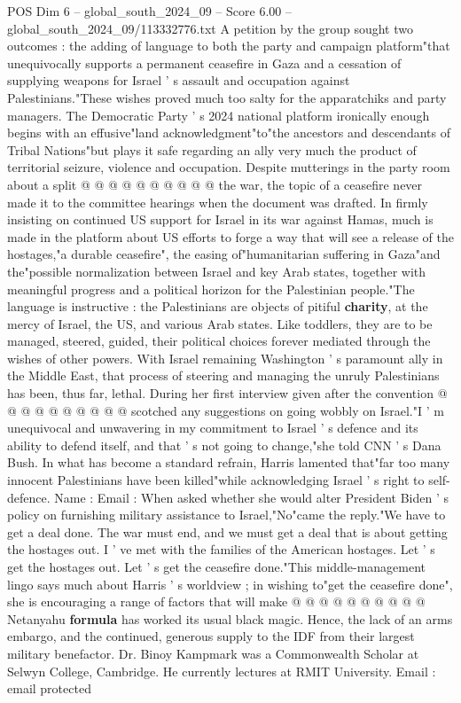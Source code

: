 \begin{textsample}{POS Dim 6 – global\_south\_2024\_09 – Score 6.00 – global\_south\_2024\_09/113332776.txt}
A petition by the group sought two outcomes : the adding of language to both the party and campaign platform"that unequivocally supports a permanent ceasefire in Gaza and a cessation of supplying weapons for Israel ' s assault and occupation against Palestinians."These wishes proved much too salty for the apparatchiks and party managers.
The Democratic Party ' s 2024 national platform ironically enough begins with an effusive"land acknowledgment"to"the ancestors and descendants of Tribal Nations"but plays it safe regarding an ally very much the product of territorial seizure, violence and occupation.
Despite mutterings in the party room about a split @ @ @ @ @ @ @ @ @ @ the war, the topic of a ceasefire never made it to the committee hearings when the document was drafted.
In firmly insisting on continued US support for Israel in its war against Hamas, much is made in the platform about US efforts to forge a way that will see a release of the hostages,"a durable ceasefire", the easing of"humanitarian suffering in Gaza"and the"possible normalization between Israel and key Arab states, together with meaningful progress and a political horizon for the Palestinian people."The language is instructive : the Palestinians are objects of pitiful \textbf{charity}, at the mercy of Israel, the US, and various Arab states.
Like toddlers, they are to be managed, steered, guided, their political choices forever mediated through the wishes of other powers.
With Israel remaining Washington ' s paramount ally in the Middle East, that process of steering and managing the unruly Palestinians has been, thus far, lethal.
During her first interview given after the convention @ @ @ @ @ @ @ @ @ @ scotched any suggestions on going wobbly on Israel."I ' m unequivocal and unwavering in my commitment to Israel ' s defence and its ability to defend itself, and that ' s not going to change,"she told CNN ' s Dana Bush.
In what has become a standard refrain, Harris lamented that"far too many innocent Palestinians have been killed"while acknowledging Israel ' s right to self-defence.
Name : Email : When asked whether she would alter President Biden ' s policy on furnishing military assistance to Israel,"No"came the reply."We have to get a deal done.
The war must end, and we must get a deal that is about getting the hostages out.
I ' ve met with the families of the American hostages.
Let ' s get the hostages out.
Let ' s get the ceasefire done."This middle-management lingo says much about Harris ' s worldview ; in wishing to"get the ceasefire done", she is encouraging a range of factors that will make @ @ @ @ @ @ @ @ @ @ Netanyahu \textbf{formula} has worked its usual black magic.
Hence, the lack of an arms embargo, and the continued, generous supply to the IDF from their largest military benefactor.
Dr.
Binoy Kampmark was a Commonwealth Scholar at Selwyn College, Cambridge.
He currently lectures at RMIT University.
Email : email protected

\end{textsample}
